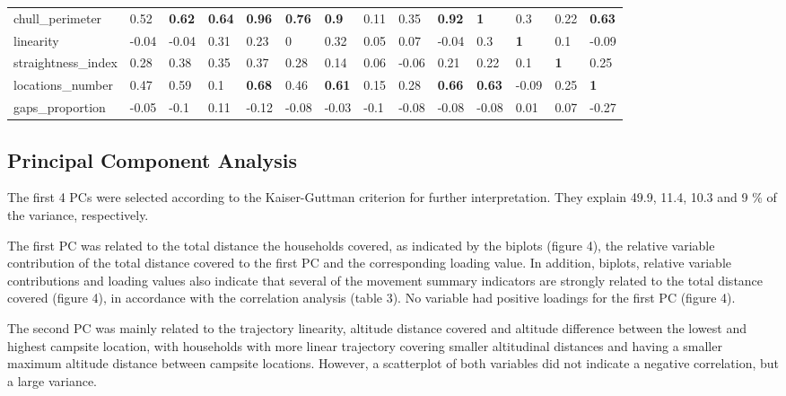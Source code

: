 \documentclass[]{elsarticle} %
\begin{document}
\begin{landscape}
\begin{longtable}[t]{llllllllllllll}
chull\_perimeter & 0.52 & \textbf{0.62} & \textbf{0.64} & \textbf{0.96} & \textbf{0.76} & \textbf{0.9} & 0.11 & 0.35 & \textbf{0.92} & \textbf{1} & 0.3 & 0.22 & \textbf{0.63}\\
\addlinespace
linearity & -0.04 & -0.04 & 0.31 & 0.23 & 0 & 0.32 & 0.05 & 0.07 & -0.04 & 0.3 & \textbf{1} & 0.1 & -0.09\\
straightness\_index & 0.28 & 0.38 & 0.35 & 0.37 & 0.28 & 0.14 & 0.06 & -0.06 & 0.21 & 0.22 & 0.1 & \textbf{1} & 0.25\\
locations\_number & 0.47 & 0.59 & 0.1 & \textbf{0.68} & 0.46 & \textbf{0.61} & 0.15 & 0.28 & \textbf{0.66} & \textbf{0.63} & -0.09 & 0.25 & \textbf{1}\\
gaps\_proportion & -0.05 & -0.1 & 0.11 & -0.12 & -0.08 & -0.03 & -0.1 & -0.08 & -0.08 & -0.08 & 0.01 & 0.07 & -0.27\\
\bottomrule
\end{longtable}
\endgroup{}
\end{landscape}

\hypertarget{principal-component-analysis-1}{%
\subsection{Principal Component
Analysis}\label{principal-component-analysis-1}}

The first 4 PCs were selected according to the Kaiser-Guttman criterion
for further interpretation. They explain 49.9, 11.4, 10.3 and 9 \% of
the variance, respectively.

The first PC was related to the total distance the households covered,
as indicated by the biplots (figure 4), the relative variable
contribution of the total distance covered to the first PC and the
corresponding loading value. In addition, biplots, relative variable
contributions and loading values also indicate that several of the
movement summary indicators are strongly related to the total distance
covered (figure 4), in accordance with the correlation analysis (table
3). No variable had positive loadings for the first PC (figure 4).

The second PC was mainly related to the trajectory linearity, altitude
distance covered and altitude difference between the lowest and highest
campsite location, with households with more linear trajectory covering
smaller altitudinal distances and having a smaller maximum altitude
distance between campsite locations. However, a scatterplot of both
variables did not indicate a negative correlation, but a large variance.
\end{document}
